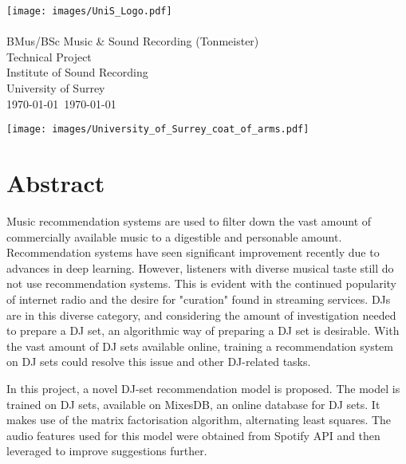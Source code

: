 
\graphicspath{{FrontMatter/}}

\begin{titlepage}
\thispagestyle{empty}
\hfill\texttt{[image: images/UniS\_Logo.pdf]}
{\sf
\centering
\null\vfil\vfil
	{
		\huge\LongTitle\\
	}
\vfil\vfil\vfil
	{
		\Large\Me\\
	}
\vfil\vfil\vfil
	{
		\Large{}BMus/BSc Music \& Sound Recording (Tonmeister)\\
		Technical Project\\
	}
\vfil\vfil
	{
		\Large{}Institute of Sound Recording\\
		University of Surrey\\
	}
\vfil
	{
		\Large\MyMonth\today~\MyYear\today\\}
	}

	{
		\texttt{[image: images/University\_of\_Surrey\_coat\_of\_arms.pdf]}
		\vspace{-.4in}
	}
\end{titlepage}

\setlength{\parskip}{1ex plus 0.2ex minus 0.2ex} %
\onehalfspacing



\chapter*{Abstract}
\thispagestyle{empty}
\setcounter{page}{2}

Music recommendation systems are used to filter down the vast amount of commercially available music to a digestible and personable amount. Recommendation systems have seen significant improvement recently due to advances in deep learning. However, listeners with diverse musical taste still do not use recommendation systems. This is evident with the continued popularity of internet radio and the desire for "curation" found in streaming services. DJs are in this diverse category, and considering the amount of investigation needed to prepare a DJ set, an algorithmic way of preparing a DJ set is desirable. With the vast amount of DJ sets available online, training a recommendation system on DJ sets could resolve this issue and other DJ-related tasks.

In this project, a novel DJ-set recommendation model is proposed. The model is trained on DJ sets, available on MixesDB, an online database for DJ sets. It makes use of the matrix factorisation algorithm, alternating least squares. The audio features used for this model were obtained from Spotify API and then leveraged to improve suggestions further.

